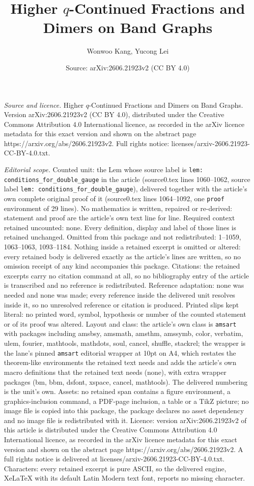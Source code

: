 \documentclass[10pt,a4paper]{amsart}
\title[Higher $q$-Continued Fractions and Dimers on Band Graphs]{Higher $q$-Continued Fractions and Dimers on Band Graphs}
\author{Wonwoo Kang, Yucong Lei}
\date{Source: arXiv:2606.21923v2 (CC BY 4.0)}
\begin{document}
\maketitle

\noindent\emph{Source and licence.} Higher $q$-Continued Fractions and Dimers on Band Graphs. Version arXiv:2606.21923v2 (CC BY 4.0), distributed under the Creative Commons Attribution 4.0 International licence, as recorded in the arXiv licence metadata for this exact version and shown on the abstract page https://arxiv.org/abs/2606.21923v2. Full rights notice: licenses/arxiv-2606.21923-CC-BY-4.0.txt.\par\smallskip

\noindent\textit{Editorial scope.} Counted unit: the Lem whose source label is \texttt{lem: conditions\_for\_double\_gauge} in the article (source0.tex lines 1060--1062, source label \texttt{lem: conditions\_for\_double\_gauge}), delivered together with the article's own complete original proof of it (source0.tex lines 1064--1092, one \texttt{proof} environment of 29 lines). No mathematics is written, repaired or re-derived: statement and proof are the article's own text line for line. Required context retained uncounted: none. Every definition, display and label of those lines is retained unchanged. Omitted from this package and not redistributed: 1--1059, 1063--1063, 1093--1184. Nothing inside a retained excerpt is omitted or altered: every retained body is delivered exactly as the article's lines are written, so no omission receipt of any kind accompanies this package. Citations: the retained excerpts carry no citation command at all, so no bibliography entry of the article is transcribed and no reference is redistributed. Reference adaptation: none was needed and none was made; every reference inside the delivered unit resolves inside it, so no unresolved reference or citation is produced. Printed slips kept literal: no printed word, symbol, hypothesis or number of the counted statement or of its proof was altered. Layout and class: the article's own class is \texttt{amsart} with packages including amsbsy, amsmath, amsthm, amssymb, color, verbatim, ulem, fourier, mathtools, mathdots, soul, cancel, shuffle, stackrel; the wrapper is the lane's pinned \texttt{amsart} editorial wrapper at 10pt on A4, which restates the theorem-like environments the retained text needs and adds the article's own macro definitions that the retained text needs (none), with extra wrapper packages (bm, bbm, dsfont, xspace, cancel, mathtools). The delivered numbering is the unit's own. Assets: no retained span contains a figure environment, a graphics-inclusion command, a PDF-page inclusion, a table or a TikZ picture; no image file is copied into this package, the package declares no asset dependency and no image file is redistributed with it. Licence: version arXiv:2606.21923v2 of this article is distributed under the Creative Commons Attribution 4.0 International licence, as recorded in the arXiv licence metadata for this exact version and shown on the abstract page https://arxiv.org/abs/2606.21923v2. A full rights notice is delivered at licenses/arxiv-2606.21923-CC-BY-4.0.txt. Characters: every retained excerpt is pure ASCII, so the delivered engine, XeLaTeX with its default Latin Modern text font, reports no missing character.
\end{document}
